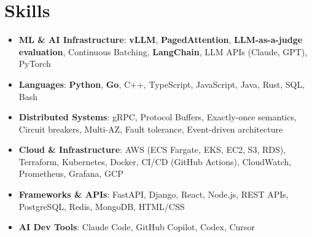 \documentclass[letterpaper,11pt]{article}
\newcommand{\resumeSubHeadingListStart}{\begin{itemize}[leftmargin=0.15in, label={}]}
\newcommand{\resumeSubHeadingListEnd}{\end{itemize}}
\newcommand{\resumeSkillHeading}[2]{%
  \item\small{\textbf{#1}: #2 \vspace{-9pt}}%
}
\begin{document}
\section{Skills}
  \resumeSubHeadingListStart
    \resumeSkillHeading{ML \& AI Infrastructure}{\textbf{vLLM}, \textbf{PagedAttention}, \textbf{LLM-as-a-judge evaluation}, Continuous Batching, \textbf{LangChain}, LLM APIs (Claude, GPT), PyTorch}
    \resumeSkillHeading{Languages}{\textbf{Python}, \textbf{Go}, C++, TypeScript, JavaScript, Java, Rust, SQL, Bash}
    \resumeSkillHeading{Distributed Systems}{gRPC, Protocol Buffers, Exactly-once semantics, Circuit breakers, Multi-AZ, Fault tolerance, Event-driven architecture}
    \resumeSkillHeading{Cloud \& Infrastructure}{AWS (ECS Fargate, EKS, EC2, S3, RDS), Terraform, Kubernetes, Docker, CI/CD (GitHub Actions), CloudWatch, Prometheus, Grafana, GCP}
    \resumeSkillHeading{Frameworks \& APIs}{FastAPI, Django, React, Node.js, REST APIs, PostgreSQL, Redis, MongoDB, HTML/CSS}
    \resumeSkillHeading{AI Dev Tools}{Claude Code, GitHub Copilot, Codex, Cursor}
  \resumeSubHeadingListEnd
\end{document}
